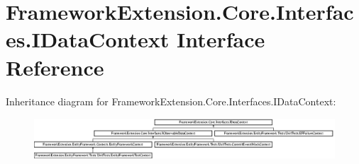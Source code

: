 \hypertarget{interface_framework_extension_1_1_core_1_1_interfaces_1_1_i_data_context}{\section{Framework\-Extension.\-Core.\-Interfaces.\-I\-Data\-Context Interface Reference}
\label{interface_framework_extension_1_1_core_1_1_interfaces_1_1_i_data_context}
}
Inheritance diagram for Framework\-Extension.\-Core.\-Interfaces.\-I\-Data\-Context\-:\begin{figure}[H]
\begin{center}
\leavevmode
\includegraphics[height=1.539519cm]{interface_framework_extension_1_1_core_1_1_interfaces_1_1_i_data_context}
\end{center}
\end{figure}

